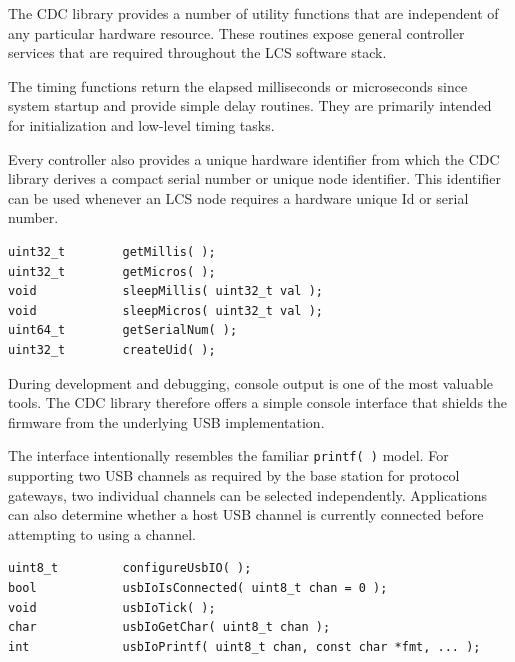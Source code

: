 
The CDC library provides a number of utility functions that are independent of
any particular hardware resource. These routines expose general controller
services that are required throughout the LCS software stack.

The timing functions return the elapsed milliseconds or microseconds since
system startup and provide simple delay routines. They are primarily intended
for initialization and low-level timing tasks.

Every controller also provides a unique hardware identifier from which the CDC
library derives a compact serial number or unique node identifier. This
identifier can be used whenever an LCS node requires a hardware unique Id
or serial number.

\lstset{language=c++, style=api-interface}
\begin{lstlisting}
uint32_t        getMillis( );
uint32_t        getMicros( );
void            sleepMillis( uint32_t val );
void            sleepMicros( uint32_t val );
uint64_t        getSerialNum( );
uint32_t        createUid( );
\end{lstlisting}
\FloatBarrier


During development and debugging, console output is one of the most valuable
tools. The CDC library therefore offers a simple console interface that shields
the firmware from the underlying USB implementation.

The interface intentionally resembles the familiar \texttt{printf( )} model. For supporting two USB channels as required by the base station for protocol gateways, two individual channels can be selected independently. Applications can also determine whether a host USB channel is currently connected before attempting to using a channel.

\lstset{language=c++, style=api-interface}
\begin{lstlisting}
uint8_t         configureUsbIO( );
bool            usbIoIsConnected( uint8_t chan = 0 );
void            usbIoTick( );
char            usbIoGetChar( uint8_t chan );            
int             usbIoPrintf( uint8_t chan, const char *fmt, ... );
\end{lstlisting}
\FloatBarrier

